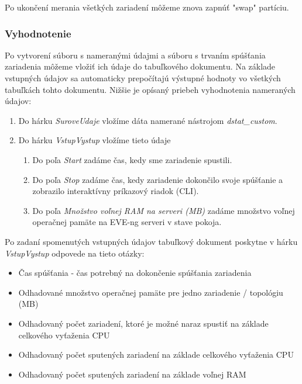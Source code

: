 Po ukončení merania všetkých zariadení môžeme znova zapnúť "swap" partíciu.





\subsubsection{Vyhodnotenie}
\label{chap:testovanie_zariadeni_benchmark_vyhodnotenie}

Po vytvorení súboru s nameranými údajmi a súboru s trvaním spúšťania zariadenia môžeme vložiť ich údaje do tabuľkového dokumentu. Na základe vstupných údajov sa automaticky prepočítajú výstupné hodnoty vo všetkých tabuľkách tohto dokumentu. Nižšie je opísaný priebeh vyhodnotenia nameraných údajov:

\begin{enumerate}[noitemsep]
    \item Do hárku \emph{SuroveUdaje} vložíme dáta namerané nástrojom \emph{dstat\_custom}.
    \item Do hárku \emph{VstupVystup} vložíme tieto údaje
    \begin{enumerate}[noitemsep]
        \item Do poľa \emph{Start} zadáme čas, kedy sme zariadenie spustili.
        \item Do poľa \emph{Stop} zadáme čas, kedy zariadenie dokončilo svoje spúšťanie a zobrazilo interaktívny príkazový riadok (CLI).
        \item Do poľa \emph{Množstvo voľnej RAM na serveri (MB)} zadáme množstvo voľnej operačnej pamäte na EVE-ng serveri v stave pokoja.
    \end{enumerate}
\end{enumerate}

Po zadaní spomenutých vstupných údajov tabuľkový dokument poskytne v hárku \emph{VstupVystup} odpovede na tieto otázky:

\begin{itemize}[noitemsep]
    \item Čas spúšťania - čas potrebný na dokončenie spúšťania zariadenia
    \item Odhadované množstvo operačnej pamäte pre jedno zariadenie / topológiu (MB)
    \item Odhadovaný počet zariadení, ktoré je možné naraz spustiť na základe celkového vyťaženia CPU
    \item Odhadovaný počet sputených zariadení na základe celkového vyťaženia CPU
    \item Odhadovaný počet sputených zariadení na základe voľnej RAM
\end{itemize}

